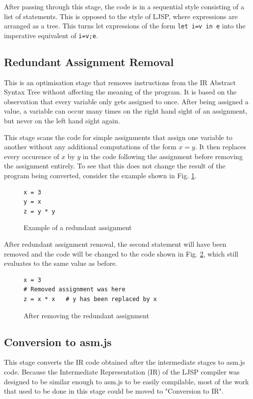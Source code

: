 \documentclass[11pt]{report}
\begin{document}
After passing through this stage, the code is in a sequential style consisting of a list of statements. This is opposed to the style of LJSP, where expressions are arranged as a tree. This turns let expressions of the form \texttt{let i=v in e} into the imperative equivalent of \texttt{i=v;e}.


\subsection{Redundant Assignment Removal}
This is an optimisation stage that removes instructions from the IR Abstract Syntax Tree without affecting the meaning of the program. It is based on the observation that every variable only gets assigned to once. After being assigned a value, a variable can occur many times on the right hand sight of an assignment, but never on the left hand sight again.

This stage scans the code for simple assignments that assign one variable to another without any additional computations of the form $x = y$. It then replaces every occurence of $x$ by $y$ in the code following the assignment before removing the assignment entirely. To see that this does not change the result of the program being converted, consider the example shown in Fig. \ref{redrem1}.
\begin{figure}[ht]
\begin{lstlisting}
x = 3
y = x
z = y * y
\end{lstlisting}
\caption{Example of a redundant assignment}
\label{redrem1}
\end{figure}

After redundant assignment removal, the second statement will have been removed and the code will be changed to the code shown in Fig. \ref{redrem2}, which still evaluates to the same value as before.
\begin{figure}[ht]
\begin{lstlisting}
x = 3
# Removed assignment was here
z = x * x   # y has been replaced by x
\end{lstlisting}
\caption{After removing the redundant assignment}
\label{redrem2}
\end{figure}


\subsection{Conversion to asm.js}
This stage converts the IR code obtained after the intermediate stages to asm.js code. Because the Intermediate Representation (IR) of the LJSP compiler was designed to be similar enough to asm.js to be easily compilable, most of the work that used to be done in this stage could be moved to "Conversion to IR".
\end{document}
